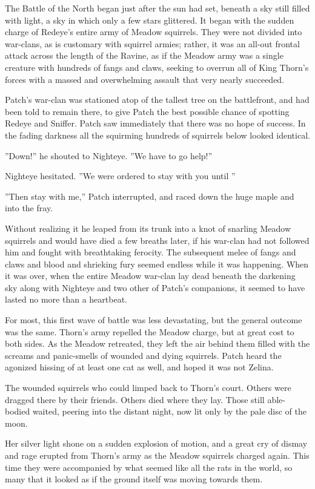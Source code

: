 \documentclass[12pt]{book}
\begin{document}
The Battle of the North began just after the sun had set, beneath a sky still filled with light, a sky in which only a few stars glittered. It began with the sudden charge of Redeye's entire army of Meadow squirrels. They were not divided into war-clans, as is customary with squirrel armies; rather, it was an all-out frontal attack across the length of the Ravine, as if the Meadow army was a single creature with hundreds of fangs and claws, seeking to overrun all of King Thorn's forces with a massed and overwhelming assault that very nearly succeeded.

Patch's war-clan was stationed atop of the tallest tree on the battlefront, and had been told to remain there, to give Patch the best possible chance of spotting Redeye and Sniffer. Patch saw immediately that there was no hope of success. In the fading darkness all the squirming hundreds of squirrels below looked identical.

''Down!'' he shouted to Nighteye. ''We have to go help!''

Nighteye hesitated. ''We were ordered to stay with you until %
''

''Then stay with me,'' Patch interrupted, and raced down the huge maple and into the fray.

Without realizing it he leaped from its trunk into a knot of snarling Meadow squirrels %
and would have died a few breaths later, if his war-clan had not followed him and fought with breathtaking ferocity. The subsequent melee of fangs and claws and blood and shrieking fury seemed endless while it was happening. When it was over, when the entire Meadow war-clan lay dead beneath the darkening sky along with Nighteye and two other of Patch's companions, it seemed to have lasted no more than a heartbeat.

For most, this first wave of battle was less devastating, but the general outcome was the same. Thorn's army repelled the Meadow charge, but at great cost to both sides. As the Meadow retreated, they left the air behind them filled with the screams and panic-smells of wounded and dying squirrels. Patch heard the agonized hissing of at least one cat as well, and hoped it was not Zelina.

The wounded squirrels who could limped back to Thorn's court. Others were dragged there by their friends. Others died where they lay. Those still able-bodied waited, peering into the distant night, now lit only by the pale disc of the moon.

Her silver light shone on a sudden explosion of motion, and a great cry of dismay and rage erupted from Thorn's army as the Meadow squirrels charged again. This time they were accompanied by what seemed like all the rats in the world, so many that it looked as if the ground itself was moving towards them.
\end{document}
